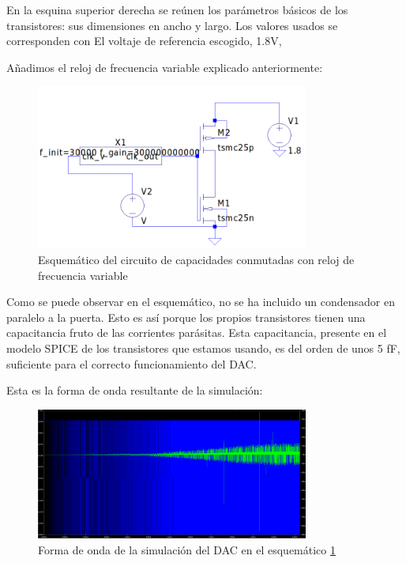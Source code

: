 \documentclass[12pt]{report} %
\begin{document}
	En la esquina superior derecha se reúnen los parámetros básicos de los transistores: sus dimensiones en ancho y largo. Los valores usados se corresponden con %
	El voltaje de referencia escogido, 1.8V, %
	
	Añadimos el reloj de frecuencia variable explicado anteriormente:

	\begin{figure}[H]
		\includegraphics[width=0.8\textwidth]{ltspice-sw-with-clk-freq.png}
		\caption[Esquemático del circuito de capacidades conmutadas con reloj de frecuencia variable]{Esquemático del circuito de capacidades conmutadas con reloj de frecuencia variable}
		\label{fig:ltspice-sw-with-clk-freq.png}
	\end{figure}

	Como se puede observar en el esquemático, no se ha incluido un condensador en paralelo a la puerta. Esto es así porque los propios transistores tienen una capacitancia fruto de las corrientes parásitas. Esta capacitancia, presente en el modelo SPICE de los transistores que estamos usando, es del orden de unos 5 fF, suficiente para el correcto funcionamiento del DAC.

	Esta es la forma de onda resultante de la simulación:
	
	\begin{figure}[H]
		\includegraphics[width=0.8\textwidth]{dac-sim-waveform.png}
		\caption[Forma de onda de la simulación del DAC en el esquemático \ref{fig:ltspice-sw-with-clk-freq.png}]{Forma de onda de la simulación del DAC en el esquemático \ref{fig:ltspice-sw-with-clk-freq.png}}
		\label{fig:dac-graph-waveform.png}
	\end{figure}
\end{document}
